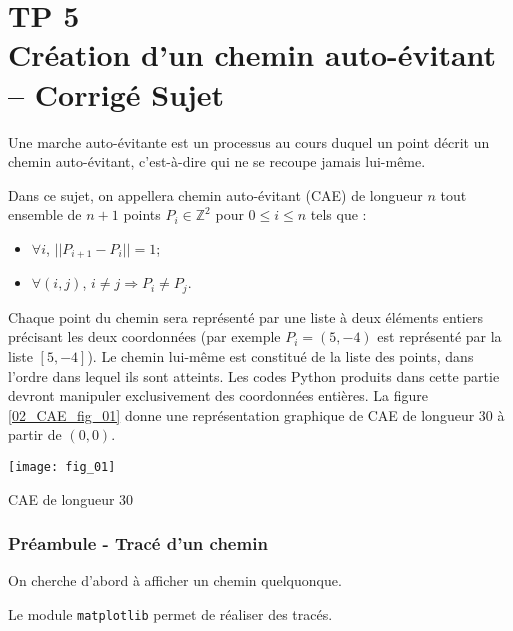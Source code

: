 \chapter*{TP 5 \\ 
Création d'un chemin auto-évitant -- \ifprof Corrigé \else Sujet \fi}

\iflivret {} \else
\ifprof  {} \else \fi
\fi

\setcounter{question}{0}
Une marche auto-évitante est un processus au cours duquel un point décrit un chemin auto-évitant, c’est-à-dire qui ne se recoupe jamais lui-même. 

Dans ce sujet, on appellera chemin auto-évitant (CAE) de longueur $n$ tout ensemble de $n+1$ points $P_i \in \mathbb{Z}^2$ pour $0 \leq i \leq n$ tels que :
\begin{itemize}[label=$\blacktriangleright$]
\item $\forall i$, $||P_{i + 1} - P_i || = 1$;
\item $\forall (i,j)$, $i\neq j \Rightarrow P_i \neq P_j$.
\end{itemize}



Chaque point du chemin sera représenté par une liste à deux éléments entiers précisant les deux coordonnées
(par exemple $P_i = \left(5, -4\right)$ est représenté par la liste $\left[5,-4\right]$). Le chemin lui-même est constitué de la liste
des points, dans l’ordre dans lequel ils sont atteints. Les codes Python produits dans cette partie devront
manipuler exclusivement des coordonnées entières.
La figure \ref{02_CAE_fig_01} donne une représentation graphique de CAE de longueur 30 à partir de $\left(0, 0\right)$.

\begin{marginfigure}
\texttt{[image: fig\_01]}
\caption{CAE de longueur 30\label{02_CAE_fig_01}}
\end{marginfigure}

\subsection*{Préambule - Tracé d'un chemin} 

On cherche d'abord à afficher un chemin quelquonque. 

Le module \lstinline{matplotlib} permet de réaliser des tracés. 


